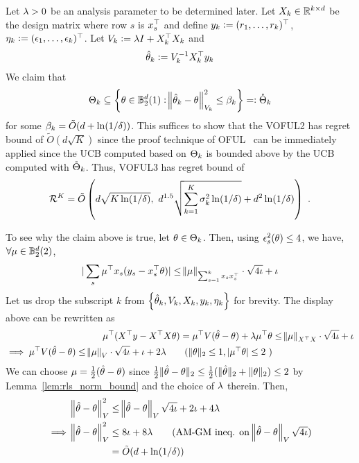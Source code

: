 Let ${\lambda}>0$ be an analysis parameter to be determined later.
Let $X_k \in {\mathbb{R}}^{k\times d}$ be the design matrix where row $s$ is $x_s^{\top}$ and define $y_k := (r_1,\ldots,r_k)^{\top}$, $\eta_k := (\epsilon_1,\ldots,\epsilon_k)^{\top}$.
Let $V_k := {\lambda} I + X_k^{\top} X_k$ and 
\begin{align}\label{eq:ridge}
  {\hat{ \theta}}_k := V_k^{-1} X_k^{\top} y_k
\end{align}
We claim that
\begin{align*}
  \Theta_k  \subseteq \cbr{\th \in \BB_2^d(1):   \norm{\hth_k - \th}_{V_k}^2 \le \beta_k } =: \mathring{\Th}_k
\end{align*}
for some $\beta_k = \tilde O(d + \ln(1/{\delta}))$.
This suffices to show that the VOFUL2 has regret bound of $\tilde O(d\sqrt{K})$ since the proof technique of OFUL~\cite{ay11improved} can be immediately applied since the UCB computed based on ${{\Theta}}_k$ is bounded above by the UCB computed with $\mathring{{{\Theta}}}_k$.
Thus, VOFUL3 has regret bound of
\begin{align*}
  \mathcal{R}^K =\tilde O\del{d\sqrt{K \ln(1/\dt)},~ d^{1.5} \sqrt{\sum_{k=1}^K \sig_k^2\ln(1/\dt)} + d^2 \ln(1/\dt)} ~.
\end{align*}

To see why the claim above is true, let ${\theta} \in \Theta_k$.
Then, using $\epsilon_s^2({\theta}) \le 4$, we have, $\forall \mu \in \mathbb{B}_2^d(2)$,
\begin{align*}
  |\sum_s \mu^{\top} x_s(y_s - x_s^{\top}{\theta})| \le \norm{\mu}_{\sum_{s=1}^k x_s x_s^{\top}} \cdot \sqrt{4\iota} + \iota
\end{align*}
Let us drop the subscript $k$ from $\cbr{\hth_k, V_k, X_k, y_k, \eta_k}$ for brevity.
The display above can be rewritten as
\begin{align*}
  \mu^\T (X^\T y - X^\T X \th)
  = \mu^\T V(\hth - \th) + \lam \mu^\T \th 
  &\le \norm{\mu}_{X^\T X} \cd \sqrt{4\iota}   + \iota
  \\\implies
  \mu^\T V(\hth - \th) \le \norm{\mu}_{V} \cd \sqrt{4\iota}   + \iota + 2\lam \tag{$\|\th\|_2 \le 1, |\mu^\T\th|\le 2$ }
\end{align*}
We can choose $\mu = { \frac{1}{2} }({\hat{ \theta}} - {\theta})$ since ${ \frac{1}{2} }\|{\hat{ \theta}} - {\theta}\|_2 \le { \frac{1}{2} } (\|{\hat{ \theta}}\|_2 + \|{\theta}\|_2)\le 2$ by Lemma~\ref{lem:rls_norm_bound}  and the choice of ${\lambda}$ therein.
Then,
\begin{align*}
  \norm{\hth - \th}_V^2 &\le \norm{\hth - \th}_V \sqrt{4\iota}  + 2\iota + 4\lam
  \\ \implies
  \norm{\hth - \th}_V^2 &\le 8\iota + 8\lam  \tag{AM-GM ineq. on $\norm{\hth - \th}_V \sqrt{4\iota}$}
  \\&= \tilde O(d + \ln(1/\dt))
\end{align*}



